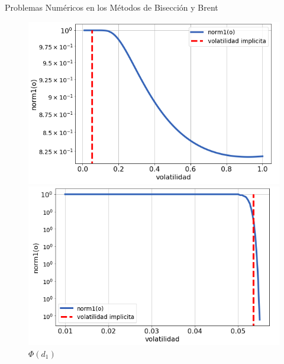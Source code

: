 \documentclass{beamer}
\begin{document}
\begin{frame}{Problemas Num\'ericos en los M\'etodos de Bisecci\'on y Brent}

    \begin{figure}[!tbp]
      \centering
      \begin{minipage}[b]{0.45\textwidth}
        \includegraphics[width=\textwidth]{norm1.png}
        \caption{$\Phi(d_1)$}
      \end{minipage}
      \hfill
      \begin{minipage}[b]{0.45\textwidth}
        \includegraphics[width=\textwidth]{norm1_c.png}
        \caption{$\Phi(d_1)$}
      \end{minipage}
    \end{figure}

\end{frame}
\end{document}

